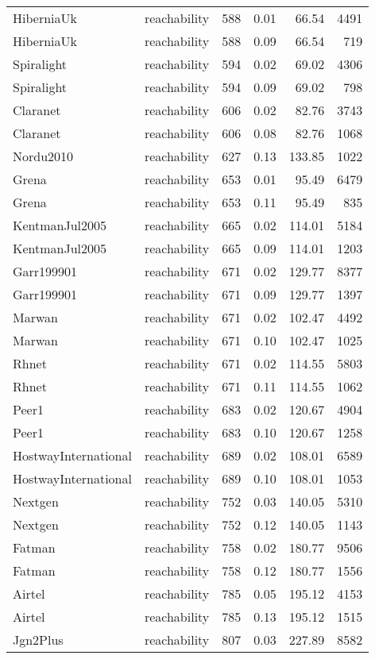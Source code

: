 \begin{tabular}{llrrrr}
HiberniaUk & reachability & 588 & 0.01 & 66.54 & 4491 \\
HiberniaUk & reachability & 588 & 0.09 & 66.54 & 719 \\
Spiralight & reachability & 594 & 0.02 & 69.02 & 4306 \\
Spiralight & reachability & 594 & 0.09 & 69.02 & 798 \\
Claranet & reachability & 606 & 0.02 & 82.76 & 3743 \\
Claranet & reachability & 606 & 0.08 & 82.76 & 1068 \\
Nordu2010 & reachability & 627 & 0.13 & 133.85 & 1022 \\
Grena & reachability & 653 & 0.01 & 95.49 & 6479 \\
Grena & reachability & 653 & 0.11 & 95.49 & 835 \\
KentmanJul2005 & reachability & 665 & 0.02 & 114.01 & 5184 \\
KentmanJul2005 & reachability & 665 & 0.09 & 114.01 & 1203 \\
Garr199901 & reachability & 671 & 0.02 & 129.77 & 8377 \\
Garr199901 & reachability & 671 & 0.09 & 129.77 & 1397 \\
Marwan & reachability & 671 & 0.02 & 102.47 & 4492 \\
Marwan & reachability & 671 & 0.10 & 102.47 & 1025 \\
Rhnet & reachability & 671 & 0.02 & 114.55 & 5803 \\
Rhnet & reachability & 671 & 0.11 & 114.55 & 1062 \\
Peer1 & reachability & 683 & 0.02 & 120.67 & 4904 \\
Peer1 & reachability & 683 & 0.10 & 120.67 & 1258 \\
HostwayInternational & reachability & 689 & 0.02 & 108.01 & 6589 \\
HostwayInternational & reachability & 689 & 0.10 & 108.01 & 1053 \\
Nextgen & reachability & 752 & 0.03 & 140.05 & 5310 \\
Nextgen & reachability & 752 & 0.12 & 140.05 & 1143 \\
Fatman & reachability & 758 & 0.02 & 180.77 & 9506 \\
Fatman & reachability & 758 & 0.12 & 180.77 & 1556 \\
Airtel & reachability & 785 & 0.05 & 195.12 & 4153 \\
Airtel & reachability & 785 & 0.13 & 195.12 & 1515 \\
Jgn2Plus & reachability & 807 & 0.03 & 227.89 & 8582 \\

\end{tabular}
